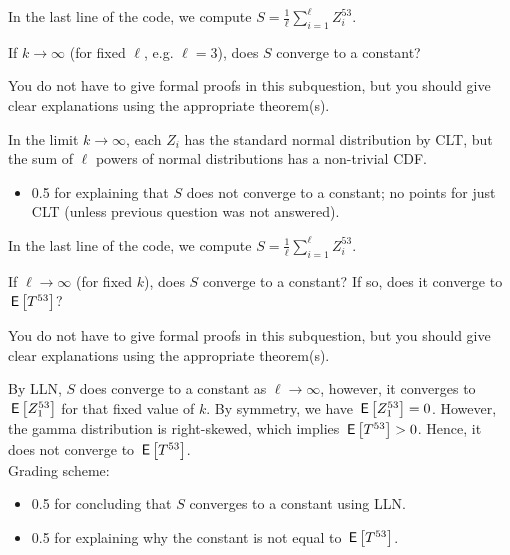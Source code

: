 \vspace*{20pt}



\begin{exercise}[0.5]
In the last line of the code, we compute $S = \frac1{\ell}\sum_{i=1}^{\ell} Z_i^{53}$.

 If $k \to \infty$ (for fixed $\ell$, e.g. $\ell=3$), does $S$ converge to a constant? 

You do not have to give formal proofs in this subquestion, but you should give clear explanations using the appropriate theorem(s). 
\begin{solution}
In the limit $k \to \infty$, each $Z_i$ has the standard normal distribution by CLT, but the sum of $\ell$ powers of normal distributions has a non-trivial CDF. \\
\begin{itemize}
\item 0.5 for explaining that $S$ does not converge to a constant; no points for just CLT (unless previous question was not answered).
\end{itemize}
\end{solution}
\end{exercise}



\vspace*{20pt}



\begin{exercise}[1]
In the last line of the code, we compute $S = \frac1{\ell}\sum_{i=1}^{\ell} Z_i^{53}$.

If $\ell \to \infty$ (for fixed $k$), does $S$ converge to a constant? 
If so, does it converge to $\,\mathsf{E}\left[T^{53}\right]$?

You do not have to give formal proofs in this subquestion, but you should give clear explanations using the appropriate theorem(s). 
\begin{solution}
By LLN, $S$ does converge to a constant as  $\ell \to \infty$, however, it converges to $\,\mathsf{E}\left[Z_1^{53}\right]$ for that fixed value of $k$. By symmetry, we have  $\,\mathsf{E}\left[Z_1^{53}\right] = 0$. However, the gamma distribution is right-skewed, which implies $\,\mathsf{E}\left[T^{53}\right] > 0$. Hence, it does not converge to $\,\mathsf{E}\left[T^{53}\right]$. \\
Grading scheme:
\begin{itemize}
\item 0.5 for concluding that $S$ converges to a constant using LLN.
\item 0.5 for explaining why the constant is not equal to $\,\mathsf{E}\left[T^{53}\right]$.
\end{itemize}
\end{solution}
\end{exercise}

